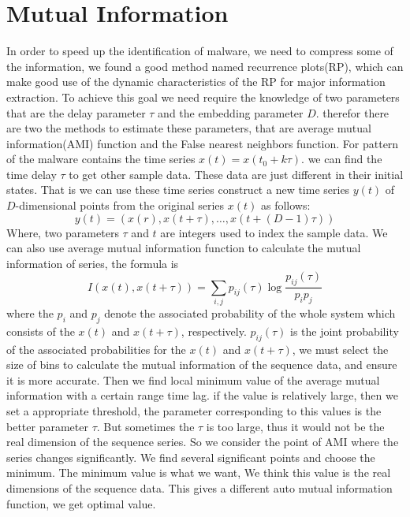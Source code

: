 \documentclass[conference]{IEEEtran}
\begin{document}
\section{Mutual Information}
In order to speed up the identification of malware, we need to compress some of the information, we found a good method named recurrence plots(RP), which can make good use of the dynamic characteristics of the RP for major information extraction. To achieve this goal we need require the knowledge of two parameters that are the delay parameter $\tau$ and the embedding parameter $D$. therefor there are two the methods to estimate these parameters, that are average mutual information(AMI) function and the False nearest neighbors function.
For pattern of the malware contains the time series $x(t)=x(t_0+k\tau)$. we can find the time delay $\tau$ to get other sample data. These data are just different in their initial states. That is we can use these time series construct a new time series $y(t)$ of $D$-dimensional points from the original series $x(t)$ as follows:
\begin{equation}
    y(t) = (x(r),x(t+\tau),\ldots,x(t+(D-1)\tau))
\end{equation}
Where, two parameters $\tau$ and $t$ are integers used to index the sample data. We can also use average mutual information function to calculate the mutual information of series, the formula is
\begin{equation}
    I(x(t), x(t+\tau)) = \sum_{i,j}p_{ij}(\tau)\log\frac{p_{ij}(\tau)}{p_ip_j}
\end{equation}
 where the $p_i$ and $p_j$  denote the associated probability of the whole system which consists of the $x(t)$ and $x(t+\tau)$, respectively. $p_{ij}(\tau)$ is the joint probability of the associated probabilities for the $x(t)$ and $x(t+\tau)$, we must select the size of bins to calculate the mutual information of the sequence data, and ensure it is more accurate. Then we find local minimum value of the average mutual information with a certain range time lag. if the value is relatively large, then we set a appropriate threshold, the parameter corresponding to this values is the better parameter $\tau$. But sometimes the $\tau$ is too large, thus it would not be the real dimension of the sequence series. So we consider the point of AMI where the series changes significantly. We find several significant points and  choose the minimum. The minimum value is what we want, We think this value is the real dimensions of the sequence data. This gives a different auto mutual information function, we get optimal value.
 
\end{document}
